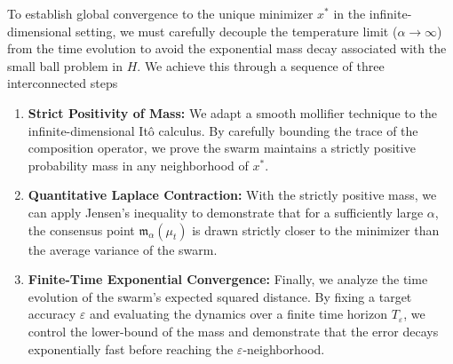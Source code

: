 \documentclass[12pt]{amsart}
\numberwithin{equation}{section}
\begin{document}
To establish global convergence to the unique minimizer $x^*$ in the infinite-dimensional setting, we must carefully decouple the temperature limit ($\alpha \to \infty$) from the time evolution to avoid the exponential mass decay associated with the small ball problem in $H$. We achieve this through a sequence of three interconnected steps 
\begin{enumerate}[label = \arabic*.]
    \item \textbf{Strict Positivity of Mass:} We adapt a smooth mollifier technique to the infinite-dimensional It\^o calculus. By carefully bounding the trace of the composition operator, we prove the swarm maintains a strictly positive probability mass in any neighborhood of $x^*$.
    \item \textbf{Quantitative Laplace Contraction:} With the strictly positive mass, we can apply Jensen's inequality to demonstrate that for a sufficiently large $\alpha$, the consensus point $\mathfrak{m}_{\alpha}(\mu_t)$ is drawn strictly closer to the minimizer than the average variance of the swarm. 
    \item \textbf{Finite-Time Exponential Convergence:} Finally, we analyze the time evolution of the swarm's expected squared distance. By fixing a target accuracy $\varepsilon$ and evaluating the dynamics over a finite time horizon $T_\varepsilon$, we control the lower-bound of the mass and demonstrate that the error decays exponentially fast before reaching the $\varepsilon$-neighborhood.
\end{enumerate}
\end{document}
